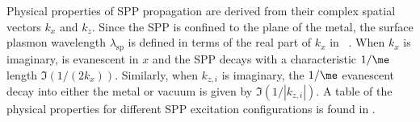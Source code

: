 Physical properties of SPP propagation are derived from their complex spatial
vectors $k_x$ and $k_z$.  Since the SPP is confined to the plane of the metal,
the surface plasmon wavelength $\lambda_\text{sp}$ is defined in terms of the
real part of $k_x$ in ~\cite{raether1997surface}.  When
$k_x$ is imaginary,  is evanescent in $x$ and the SPP
decays with a characteristic $1/\me$ length $\Im(1/(2k_x))$.  Similarly, when
$k_{z,i}$ is imaginary, the $1/\me$ evanescent decay into either the metal or
vacuum is given by $\Im(1/|k_{z,i}|)$.  A table of the physical properties for
different SPP excitation configurations is found in
.
